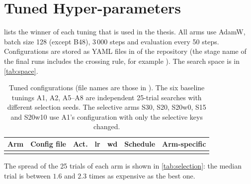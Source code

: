 \chapter{Tuned Hyper-parameters}\label{app:hyperparameters}
 lists the winner of each tuning that is used in the thesis. All arms use AdamW, batch size 128 (except B48), 3\,000 steps and evaluation every 50 steps. Configurations are stored as YAML files in  of the repository (the stage name of the final runs includes the crossing rule, for example ). The search space is in \cref{tab:space}.

\begin{table}[h]
\centering\footnotesize
\caption{Tuned configurations (file names are those in ). The six baseline tunings A1, A2, A5--A8 are independent 25-trial searches with different selection seeds. The selective arms S30, S20, S20w0, S15 and S20w10 use A1's configuration with only the selective keys changed.}
\label{tab:tuned}
\begin{tabular}{@{}l l l r r l p{4.6cm}@{}}
\toprule
Arm & Config file & Act. & lr & wd & Schedule & Arm-specific\\
\midrule
\\
\bottomrule
\end{tabular}
\end{table}

The spread of the 25 trials of each arm is shown in \cref{tab:selection}: the median trial is between $1.6$ and $2.3$ times as expensive as the best one.
